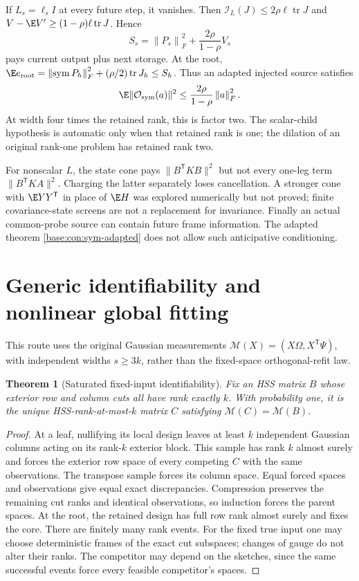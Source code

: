 \documentclass[11pt,oneside,openany,a4paper]{book}
\numberwithin{equation}{chapter}
\newtheorem{theorem}{Theorem}[chapter]
\theoremstyle{definition}
\theoremstyle{remark}
\newcommand{\T}{\mathsf T}\newcommand{\Id}{I}
\newcommand{\F}[1]{\left\lVert#1\right\rVert_F}
\DeclareMathOperator{\tr}{tr}\DeclareMathOperator{\rank}{rank}
\begin{document}
If $L_s=\ell_sI$ at every future step, it vanishes. Then
$\mathcal I_L(J)\le2\rho\ell\tr J$ and
$V-\E V'\ge(1-\rho)\ell\tr J$. Hence
\[
 S_s=\F{P_s}^2+\frac{2\rho}{1-\rho}V_s
\]
pays current output plus next storage. At the root,
$\E e_{\rm root}=\F{\operatorname{sym}P_h}^2+(\rho/2)\tr J_h\le S_h$.
Thus an adapted injected source satisfies
\begin{equation}\label{base:con:sym-adapted}
 \E\|\mathcal O_{\rm sym}(a)\|^2
 \le\frac{2\rho}{1-\rho}\F a^2.
\end{equation}
At width four times the retained rank, this is factor two. The scalar-child hypothesis is automatic only when that retained rank is one; the dilation of an original rank-one problem has retained rank two.

For nonscalar $L$, the state cone pays $\|B^\T KB\|^2$ but not every one-leg term $\|B^\T KA\|^2$. Charging the latter separately loses cancellation. A stronger cone with $\E YY^\T$ in place of $\E H$ was explored numerically but not proved; finite covariance-state screens are not a replacement for invariance. Finally an actual common-probe source can contain future frame information. The adapted theorem \eqref{base:con:sym-adapted} does not allow such anticipative conditioning.

\section{Generic identifiability and nonlinear global fitting}\label{base:con:identifiability}
This route uses the original Gaussian measurements
$\mathcal M(X)=(X\Omega,X^\T\Psi)$, with independent widths $s\ge3k$, rather than the fixed-space orthogonal-refit law.

\begin{theorem}[Saturated fixed-input identifiability]\label{base:con:identifiable}
Fix an HSS matrix $B$ whose exterior row and column cuts all have rank exactly $k$. With probability one, it is the unique HSS-rank-at-most-$k$ matrix $C$ satisfying $\mathcal M(C)=\mathcal M(B)$.
\end{theorem}
\begin{proof}
At a leaf, nullifying its local design leaves at least $k$ independent Gaussian columns acting on its rank-$k$ exterior block. This sample has rank $k$ almost surely and forces the exterior row space of every competing $C$ with the same observations. The transpose sample forces its column space. Equal forced spaces and observations give equal exact discrepancies. Compression preserves the remaining cut ranks and identical observations, so induction forces the parent spaces. At the root, the retained design has full row rank almost surely and fixes the core. There are finitely many rank events. For the fixed true input one may choose deterministic frames of the exact cut subspaces; changes of gauge do not alter their ranks. The competitor may depend on the sketches, since the same successful events force every feasible competitor's spaces.
\end{proof}
\end{document}
